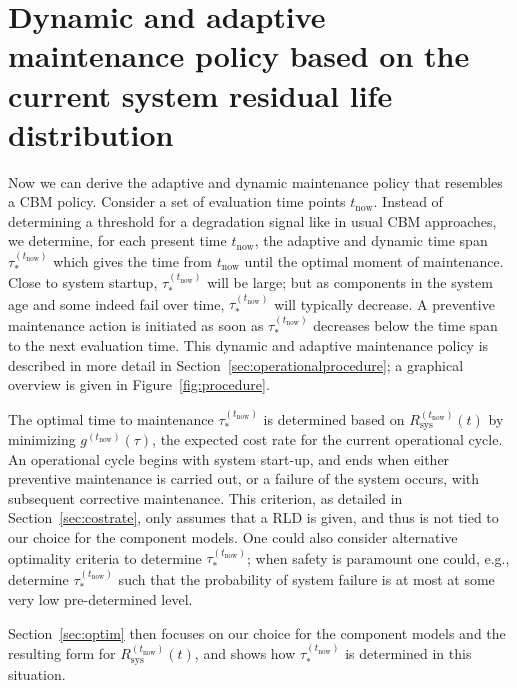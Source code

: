 \documentclass[authoryear]{elsarticle}
\def\tnow{t_\text{now}}
\newcommand{\Rsysnow}{R^{(t_\text{now})}_\text{sys}}
\newcommand{\gnow}{g^{(\tnow)}}
\newcommand{\tausnow}{\tau_*^{(\tnow)}}
\newcommand{\tprep}{\tau_{\text{prep}}}
\newcommand{\tthresh}{\tau_{\text{thresh}}}
\begin{document}
\section{Dynamic and adaptive maintenance policy based on the current system residual life distribution}
\label{sec:policy}

Now we can derive the adaptive and dynamic maintenance policy
that resembles a CBM policy.
Consider a set of evaluation time points $\tnow$.
Instead of determining a threshold for a degradation signal like in usual CBM approaches,
we determine, for each present time $\tnow$,
the adaptive and dynamic time span $\tausnow$ which gives the time from $\tnow$ until the optimal moment of maintenance.
Close to system startup, $\tausnow$ will be large;
but as components in the system age and some indeed fail over time,
$\tausnow$ will typically decrease.
A preventive maintenance action is initiated
as soon as $\tausnow$ decreases below the time span to the next evaluation time.
This dynamic and adaptive maintenance policy is described in more detail in Section~\ref{sec:operationalprocedure};
a graphical overview is given in Figure~\ref{fig:procedure}.

The optimal time to maintenance $\tausnow$ is determined based on $\Rsysnow(t)$
by minimizing $\gnow(\tau)$, the expected cost rate for the current operational cycle.
An operational cycle begins with system start-up,
and ends when either preventive maintenance is carried out,
or a failure of the system occurs, with subsequent corrective maintenance.
This criterion, as detailed in Section~\ref{sec:costrate},
only assumes that a RLD is given,
and thus is not tied to our choice for the component models.
One could also consider alternative optimality criteria to determine $\tausnow$;
when safety is paramount one could, e.g., determine $\tausnow$ such that
the probability of system failure is at most at some very low pre-determined level.

Section~\ref{sec:optim} then focuses on our choice for the component models and the resulting form for $\Rsysnow(t)$,
and shows how $\tausnow$ is determined in this situation.
\end{document}
